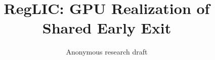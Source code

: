 \documentclass[10pt,twocolumn,letterpaper]{article}
\title{RegLIC: GPU Realization of Shared Early Exit}
\author{Anonymous research draft}
\begin{document}
\raggedbottom
\maketitle

\end{document}

